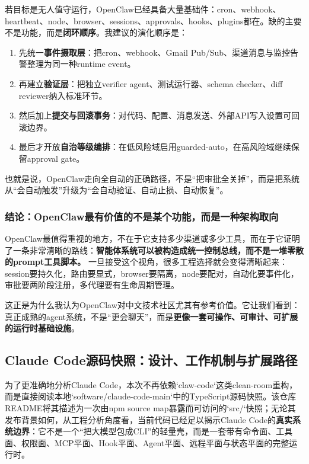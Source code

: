 \documentclass[12pt,a4paper]{article}
\begin{document}
若目标是无人值守运行，OpenClaw已经具备大量基础件：cron、webhook、heartbeat、node、browser、sessions、approvals、hooks、plugins都在。缺的主要不是功能，而是\textbf{闭环顺序}。我建议的演化顺序是：

\begin{enumerate}
    \item 先统一\textbf{事件摄取层}：把cron、webhook、Gmail Pub/Sub、渠道消息与监控告警整理为同一种runtime event。
    \item 再建立\textbf{验证层}：把独立verifier agent、测试运行器、schema checker、diff reviewer纳入标准环节。
    \item 然后加上\textbf{提交与回滚事务}：对代码、配置、消息发送、外部API写入设置可回滚边界。
    \item 最后才开放\textbf{自治等级编排}：在低风险域启用guarded-auto，在高风险域继续保留approval gate。
\end{enumerate}

也就是说，OpenClaw走向全自动的正确路径，不是“把审批全关掉”，而是把系统从“会自动触发”升级为“会自动验证、自动止损、自动恢复”。

\subsubsection{结论：OpenClaw最有价值的不是某个功能，而是一种架构取向}

OpenClaw最值得重视的地方，不在于它支持多少渠道或多少工具，而在于它证明了一条非常清晰的路线：\textbf{智能体系统可以被构造成统一控制总线，而不是一堆零散的prompt工具脚本。} 一旦接受这个视角，很多工程选择就会变得清晰起来：session要持久化，路由要显式，browser要隔离，node要配对，自动化要事件化，审批要两阶段注册，多代理要有生命周期管理。

这正是为什么我认为OpenClaw对中文技术社区尤其有参考价值。它让我们看到：真正成熟的agent系统，不是“更会聊天”，而是\textbf{更像一套可操作、可审计、可扩展的运行时基础设施}。

\subsection{Claude Code源码快照：设计、工作机制与扩展路径}

为了更准确地分析Claude Code，本次不再依赖`claw-code`这类clean-room重构，而是直接阅读本地`software/claude-code-main`中的TypeScript源码快照。该仓库README将其描述为一次由npm source map暴露而可访问的`src/`快照；无论其发布背景如何，从工程分析角度看，当前代码已经足以揭示Claude Code的\textbf{真实系统边界}：它不是一个“把大模型包成CLI”的轻量壳，而是一套带有命令面、工具面、权限面、MCP平面、Hook平面、Agent平面、远程平面与状态平面的完整运行时。
\end{document}
